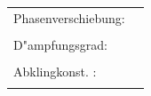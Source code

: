 \begin{tabular}{|p{4cm}|p{14cm}|}
\hline
Phasenverschiebung: &
\begin{minipage}[]{14cm}
\vspace{0.2cm}
$\varphi_U=\arctan\left(\dfrac{2D\,\eta}{1-\eta^2}\right)-\pi$\\
\end{minipage}\\
\hline
D"ampfungsgrad: &
\begin{minipage}[]{14cm}
\vspace{0.2cm}
$D=\dfrac{R_S}{2}\sqrt{\dfrac{C}{L}}$\\
\end{minipage}\\
\hline
Abklingkonst. : &
\begin{minipage}[]{14cm}
\vspace{0.2cm}
$\delta=\dfrac{R_S}{2L}$\\
\end{minipage}\\
\hline
\end{tabular}

